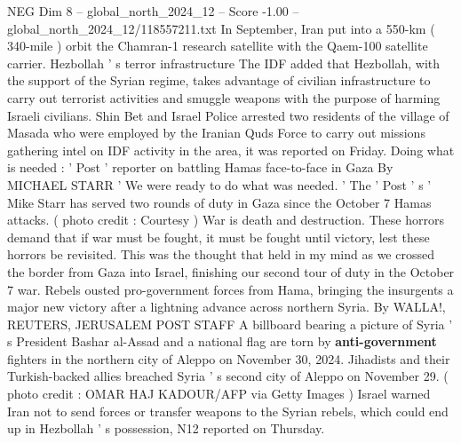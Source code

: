 \begin{textsample}{NEG Dim 8 – global\_north\_2024\_12 – Score -1.00 – global\_north\_2024\_12/118557211.txt}
In September, Iran put into a 550-km ( 340-mile ) orbit the Chamran-1 research satellite with the Qaem-100 satellite carrier.
Hezbollah ' s terror infrastructure The IDF added that Hezbollah, with the support of the Syrian regime, takes advantage of civilian infrastructure to carry out terrorist activities and smuggle weapons with the purpose of harming Israeli civilians.
Shin Bet and Israel Police arrested two residents of the village of Masada who were employed by the Iranian Quds Force to carry out missions gathering intel on IDF activity in the area, it was reported on Friday.
Doing what is needed : ' Post ' reporter on battling Hamas face-to-face in Gaza By MICHAEL STARR ' We were ready to do what was needed. ' The ' Post ' s ' Mike Starr has served two rounds of duty in Gaza since the October 7 Hamas attacks. ( photo credit : Courtesy ) War is death and destruction.
These horrors demand that if war must be fought, it must be fought until victory, lest these horrors be revisited.
This was the thought that held in my mind as we crossed the border from Gaza into Israel, finishing our second tour of duty in the October 7 war.
Rebels ousted pro-government forces from Hama, bringing the insurgents a major new victory after a lightning advance across northern Syria.
By WALLA!, REUTERS, JERUSALEM POST STAFF A billboard bearing a picture of Syria ' s President Bashar al-Assad and a national flag are torn by \textbf{anti-government} fighters in the northern city of Aleppo on November 30, 2024.
Jihadists and their Turkish-backed allies breached Syria ' s second city of Aleppo on November 29. ( photo credit : OMAR HAJ KADOUR/AFP via Getty Images ) Israel warned Iran not to send forces or transfer weapons to the Syrian rebels, which could end up in Hezbollah ' s possession, N12 reported on Thursday.

\end{textsample}
